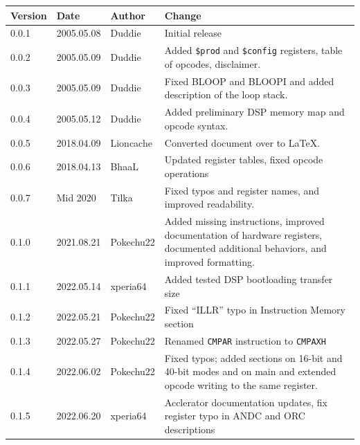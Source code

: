 \documentclass[oneside,english,a4paper,10pt,oneside,openany,final]{memoir}
\newcommand{\Register}[1]{\texttt{#1}}
\begin{document}
\begin{table}[htb]
\centering
\begin{tabular}{|p{.5in}|p{.75in}|p{.75in}|p{3.5in}|}
\hline
\textbf{Version} & \textbf{Date} & \textbf{Author} & \textbf{Change}                                                                          \\ \hline
0.0.1            & 2005.05.08    & Duddie          & Initial release                                                                          \\ \hline
0.0.2            & 2005.05.09    & Duddie          & Added \Register{\$prod} and \Register{\$config} registers, table of opcodes, disclaimer. \\ \hline
0.0.3            & 2005.05.09    & Duddie          & Fixed BLOOP and BLOOPI and added description of the loop stack.                          \\ \hline
0.0.4            & 2005.05.12    & Duddie          & Added preliminary DSP memory map and opcode syntax.                                      \\ \hline
0.0.5            & 2018.04.09    & Lioncache       & Converted document over to LaTeX.                                                        \\ \hline
0.0.6            & 2018.04.13    & BhaaL           & Updated register tables, fixed opcode operations                                         \\ \hline
0.0.7            & Mid 2020      & Tilka           & Fixed typos and register names, and improved readability.                                \\ \hline
0.1.0            & 2021.08.21    & Pokechu22       & Added missing instructions, improved documentation of hardware registers, documented additional behaviors, and improved formatting. \\ \hline
0.1.1            & 2022.05.14    & xperia64        & Added tested DSP bootloading transfer size                                               \\ \hline
0.1.2            & 2022.05.21    & Pokechu22       & Fixed ``ILLR'' typo in Instruction Memory section                                        \\ \hline
0.1.3            & 2022.05.27    & Pokechu22       & Renamed \texttt{CMPAR} instruction to \texttt{CMPAXH}                                    \\ \hline
0.1.4            & 2022.06.02    & Pokechu22       & Fixed typos; added sections on 16-bit and 40-bit modes and on main and extended opcode writing to the same register. \\ \hline
0.1.5            & 2022.06.20    & xperia64        & Acclerator documentation updates, fix register typo in ANDC and ORC descriptions         \\ \hline
\end{tabular}
\end{table}
\end{document}
